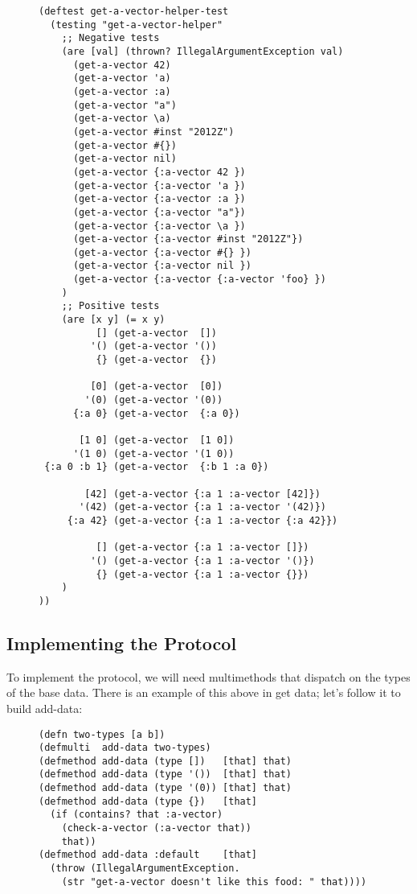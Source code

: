 \documentclass[11pt]{article}
\begin{document}
\begin{figure}[H]
\label{test-get-a-vector-helper}
\begin{verbatim}
(deftest get-a-vector-helper-test
  (testing "get-a-vector-helper"
    ;; Negative tests
    (are [val] (thrown? IllegalArgumentException val)
      (get-a-vector 42)
      (get-a-vector 'a)
      (get-a-vector :a)
      (get-a-vector "a")
      (get-a-vector \a)
      (get-a-vector #inst "2012Z")
      (get-a-vector #{})
      (get-a-vector nil)
      (get-a-vector {:a-vector 42 })
      (get-a-vector {:a-vector 'a })
      (get-a-vector {:a-vector :a })
      (get-a-vector {:a-vector "a"})
      (get-a-vector {:a-vector \a })
      (get-a-vector {:a-vector #inst "2012Z"})
      (get-a-vector {:a-vector #{} })
      (get-a-vector {:a-vector nil })
      (get-a-vector {:a-vector {:a-vector 'foo} })
    )
    ;; Positive tests
    (are [x y] (= x y)
          [] (get-a-vector  [])
         '() (get-a-vector '())
          {} (get-a-vector  {})

         [0] (get-a-vector  [0])
        '(0) (get-a-vector '(0))
      {:a 0} (get-a-vector  {:a 0})

       [1 0] (get-a-vector  [1 0])
      '(1 0) (get-a-vector '(1 0))
 {:a 0 :b 1} (get-a-vector  {:b 1 :a 0})

        [42] (get-a-vector {:a 1 :a-vector [42]})
       '(42) (get-a-vector {:a 1 :a-vector '(42)})
     {:a 42} (get-a-vector {:a 1 :a-vector {:a 42}})

          [] (get-a-vector {:a 1 :a-vector []})
         '() (get-a-vector {:a 1 :a-vector '()})
          {} (get-a-vector {:a 1 :a-vector {}})
    )
))
\end{verbatim}
\end{figure}
\subsection{Implementing the Protocol}
\label{sec-4-4}

To implement the protocol, we will need multimethods that dispatch on
the types of the base data. There is an example of this above in get
data; let's follow it to build add-data:

\begin{figure}[H]
\label{add-data}
\begin{verbatim}
(defn two-types [a b])
(defmulti  add-data two-types)
(defmethod add-data (type [])   [that] that)
(defmethod add-data (type '())  [that] that)
(defmethod add-data (type '(0)) [that] that)
(defmethod add-data (type {})   [that]
  (if (contains? that :a-vector)
    (check-a-vector (:a-vector that))
    that))
(defmethod add-data :default    [that]
  (throw (IllegalArgumentException.
    (str "get-a-vector doesn't like this food: " that))))
\end{verbatim}
\end{figure}
\end{document}
